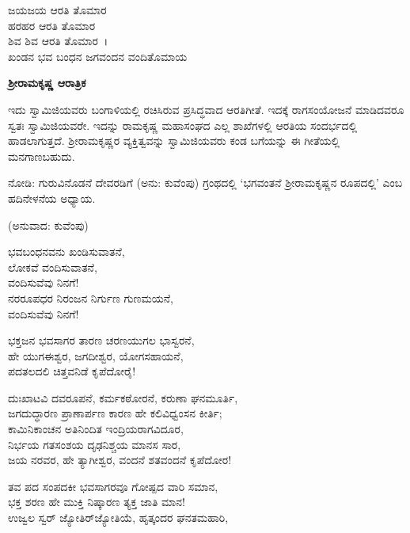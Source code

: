 \begin{myquote}
ಜಯಜಯ ಆರತಿ ತೊಮಾರ\\ಹರಹರ ಆರತಿ ತೊಮಾರ\\ಶಿವ ಶಿವ ಆರತಿ ತೊಮಾರ~।\\ಖಂಡನ ಭವ ಬಂಧನ ಜಗವಂದನ ವಂದಿತೊಮಾಯ
\end{myquote}


\begin{center}
\textbf{ಶ‍್ರೀರಾಮಕೃಷ್ಣ ಆರಾತ್ರಿಕ}
\end{center}

ಇದು ಸ್ವಾಮಿಜಿಯವರು ಬಂಗಾಳಿಯಲ್ಲಿ ರಚಿಸಿರುವ ಪ್ರಸಿದ್ಧವಾದ ಆರತಿಗೀತೆ. ಇದಕ್ಕೆ ರಾಗಸಂಯೋಜನೆ ಮಾಡಿದವರೂ ಸ್ವತಃ ಸ್ವಾಮಿಜಿಯವರೇ. ಇದನ್ನು ರಾಮಕೃಷ್ಣ ಮಹಾಸಂಘದ ಎಲ್ಲ ಶಾಖೆಗಳಲ್ಲಿ ಆರತಿಯ ಸಂದರ್ಭದಲ್ಲಿ ಹಾಡಲಾಗುತ್ತದೆ. ಶ‍್ರೀರಾಮಕೃಷ್ಣರ ವ್ಯಕ್ತಿತ್ವವನ್ನು ಸ್ವಾಮಿಜಿಯವರು ಕಂಡ ಬಗೆಯನ್ನು ಈ ಗೀತೆಯಲ್ಲಿ ಮನಗಾಣಬಹುದು.

ನೋಡಿ: ಗುರುವಿನೊಡನೆ ದೇವರಡಿಗೆ (ಅನು: ಕುವೆಂಪು) ಗ್ರಂಥದಲ್ಲಿ ‘ಭಗವಂತನೆ ಶ‍್ರೀರಾಮಕೃಷ್ಣನ ರೂಪದಲ್ಲಿ’ ಎಂಬ ಹದಿನೇಳನೆಯ ಅಧ್ಯಾಯ.

\begin{center}
(ಅನುವಾದ: ಕುವೆಂಪು)
\end{center}

\begin{myquote}
ಭವಬಂಧನವನು ಖಂಡಿಸುವಾತನೆ,\\ಲೋಕವೆ ವಂದಿಸುವಾತನೆ,\\ವಂದಿಸುವೆವು ನಿನಗೆ!\\ನರರೂಪಧರ ನಿರಂಜನ ನಿರ್ಗುಣ ಗುಣಮಯನೆ,\\ವಂದಿಸುವೆವು ನಿನಗೆ!
\end{myquote}

\begin{myquote}
ಭಕ್ತಜನ ಭವಸಾಗರ ತಾರಣ ಚರಣಯುಗಲ ಭಾಸ್ವರನೆ,\\ಹೇ ಯುಗಈಶ್ವರ, ಜಗದೀಶ್ವರ, ಯೋಗಸಹಾಯನೆ,\\ಪದತಲದಲಿ ಚಿತ್ತವನಿಡೆ ಕೃಪೆದೋರೈ!
\end{myquote}

\begin{myquote}
ದುಃಖಾಟವಿ ದವರೂಪನೆ, ಕರ್ಮಕಠೋರನೆ, ಕರುಣಾ ಘನಮೂರ್ತಿ,\\ಜಗದುದ್ಧಾರಣ ಪ್ರಾಣಾರ್ಪಣ ಕಾರಣ ಹೇ ಕಲಿವಿಧ್ವಂಸನ ಕೀರ್ತಿ;\\ಕಾಮಿನಿಕಾಂಚನ ಅತಿನಿಂದಿತ ಇಂದ್ರಿಯರಾಗವಿದೂರ,\\ನಿರ್ಭಯ ಗತಸಂಶಯ ದೃಢನಿಶ್ಚಯ ಮಾನಸ ಸಾರ,\\ಜಯ ನರವರ, ಹೇ ತ್ಯಾಗೀಶ್ವರ, ವಂದನೆ ಶತವಂದನೆ ಕೃಪೆದೋರ!
\end{myquote}

\begin{myquote}
ತವ ಪದ ಸಂಪದಕೀ ಭವಸಾಗರವೂ ಗೋಷ್ಪದ ವಾರಿ ಸಮಾನ,\\ಭಕ್ತ ಶರಣ ಹೇ ಮುಕ್ತಿ ನಿಷ್ಕಾರಣ ತ್ಯಕ್ತ ಜಾತಿ ಮಾನ!\\ಉಜ್ವಲ ಸ್ವರ್ ಜ್ಯೋತಿರ್‌ಜ್ಯೋತಿಯೆ, ಹೃತ್ಕಂದರ ಘನತಮಹಾರಿ,
\end{myquote}

